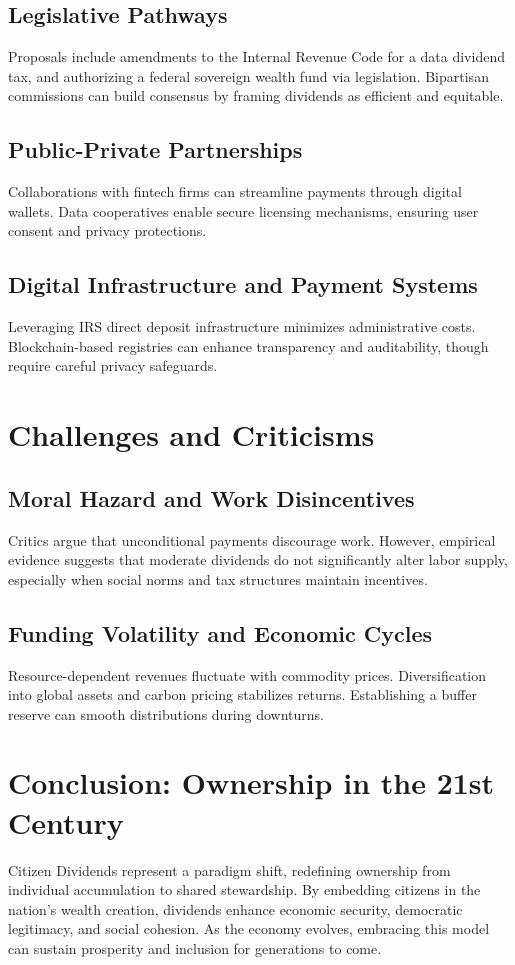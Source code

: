 \documentclass[11pt]{article}
\begin{document}
\subsection{Legislative Pathways}
Proposals include amendments to the Internal Revenue Code for a data dividend tax, and authorizing a federal sovereign wealth fund via legislation. Bipartisan commissions can build consensus by framing dividends as efficient and equitable.

\subsection{Public-Private Partnerships}
Collaborations with fintech firms can streamline payments through digital wallets. Data cooperatives enable secure licensing mechanisms, ensuring user consent and privacy protections.

\subsection{Digital Infrastructure and Payment Systems}
Leveraging IRS direct deposit infrastructure minimizes administrative costs. Blockchain-based registries can enhance transparency and auditability, though require careful privacy safeguards.

\section{Challenges and Criticisms}
\subsection{Moral Hazard and Work Disincentives}
Critics argue that unconditional payments discourage work. However, empirical evidence suggests that moderate dividends do not significantly alter labor supply, especially when social norms and tax structures maintain incentives.

\subsection{Funding Volatility and Economic Cycles}
Resource-dependent revenues fluctuate with commodity prices. Diversification into global assets and carbon pricing stabilizes returns. Establishing a buffer reserve can smooth distributions during downturns.

\section{Conclusion: Ownership in the 21st Century}
Citizen Dividends represent a paradigm shift, redefining ownership from individual accumulation to shared stewardship. By embedding citizens in the nation’s wealth creation, dividends enhance economic security, democratic legitimacy, and social cohesion. As the economy evolves, embracing this model can sustain prosperity and inclusion for generations to come.



\end{document}
